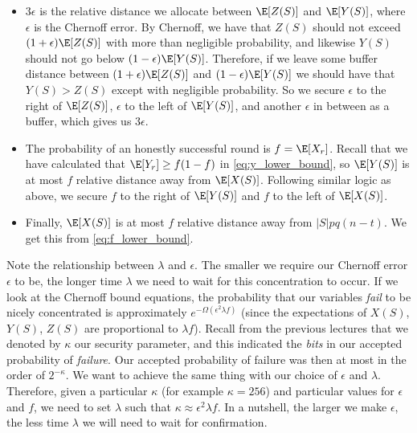 \begin{itemize}
    \item $3 \epsilon$ is the relative distance we allocate between $\E[Z(S)]$ and $\E[Y(S)]$, where $\epsilon$ is the Chernoff error. By Chernoff, we have that $Z(S)$ should not exceed $(1+\epsilon)\E[Z(S)]$ with more than negligible probability, and likewise $Y(S)$ should not go below $(1-\epsilon)\E[Y(S)]$. Therefore, if we leave some buffer distance between $(1+\epsilon)\E[Z(S)]$ and $(1-\epsilon)\E[Y(S)]$ we should have that $Y(S) > Z(S)$ except with negligible probability. So we secure $\epsilon$ to the right of $\E[Z(S)]$, $\epsilon$ to the left of $\E[Y(S)]$, and another $\epsilon$ in between as a buffer, which gives us $3 \epsilon$.

    \item The probability of an honestly successful round is $f=\E[X_r]$. Recall that we have calculated that $\E[Y_r] \geq f (1-f)$ in \eqref{eq:y_lower_bound}, so $\E[Y(S)]$ is at most $f$ relative distance away from $\E[X(S)]$. Following similar logic as above, we secure $f$ to the right of $\E[Y(S)]$ and $f$ to the left of $\E[X(S)]$.

    \item Finally, $\E[X(S)]$ is at most $f$ relative distance away from $|S|pq(n-t)$. We get this from \eqref{eq:f_lower_bound}.

\end{itemize}

Note the relationship between $\lambda$ and $\epsilon$. The smaller we require our Chernoff error $\epsilon$ to be, the longer time $\lambda$ we need to wait for this concentration to occur. If we look at the Chernoff bound equations, the probability that our variables \emph{fail} to be nicely concentrated is approximately $e^{-\Omega(\epsilon^2 \lambda f)}$ (since the expectations of $X(S)$, $Y(S)$, $Z(S)$ are proportional to $\lambda f$). Recall from the previous lectures that we denoted by $\kappa$ our security parameter, and this indicated the \emph{bits} in our accepted probability of \emph{failure}. Our accepted probability of failure was then at most in the order of $2^{-\kappa}$. We want to achieve the same thing with our choice of $\epsilon$ and $\lambda$. Therefore, given a particular $\kappa$ (for example $\kappa = 256$) and particular values for $\epsilon$ and $f$, we need to set $\lambda$ such that $\kappa \approx \epsilon^2 \lambda f$. In a nutshell, the larger we make $\epsilon$, the less time $\lambda$ we will need to wait for confirmation.

